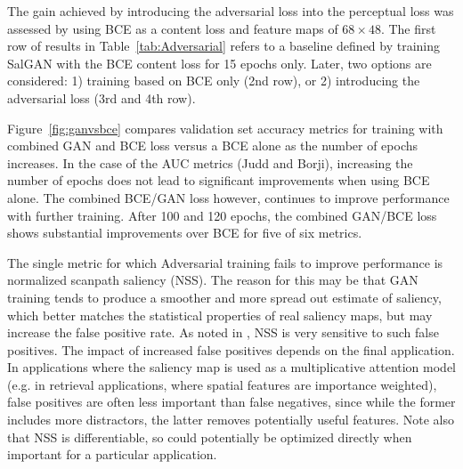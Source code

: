 \documentclass[times,twocolumn,final,authoryear]{elsarticle}
\begin{document}
The gain achieved by introducing the adversarial loss into the perceptual loss was assessed by using BCE as a content loss and feature maps of $68 \times 48$.
The first row of results in Table~\ref{tab:Adversarial} refers to a baseline defined by training SalGAN with the BCE content loss for 15 epochs only. 
Later, two options are considered: 1) training based on BCE only (2nd row), or 2) introducing the adversarial loss (3rd and 4th row). %

Figure~\ref{fig:ganvsbce} compares validation set accuracy metrics for training with combined GAN and BCE loss versus a BCE alone as the number of epochs increases. In the case of the AUC metrics (Judd and Borji), increasing the number of epochs does not lead to significant improvements when using BCE alone. The combined BCE/GAN loss however, continues to improve performance with further training. After 100 and 120 epochs, the combined GAN/BCE loss shows substantial improvements over BCE for five of six metrics.

The single metric for which Adversarial training fails to improve performance is normalized scanpath saliency (NSS). The reason for this may be that GAN training tends to produce a smoother and more spread out estimate of saliency, which better matches the statistical properties of real saliency maps, but may increase the false positive rate. As noted in \citep{Bylinskii2016metrics}, NSS is very sensitive to such false positives. The impact of increased false positives depends on the final application. In applications where the saliency map is used as a multiplicative attention model (e.g. in retrieval applications, where spatial features are importance weighted), false positives are often less important than false negatives, since while the former includes more distractors, the latter removes potentially useful features. Note also that NSS is differentiable, so could potentially be optimized directly when important for a particular application.


\end{document}
